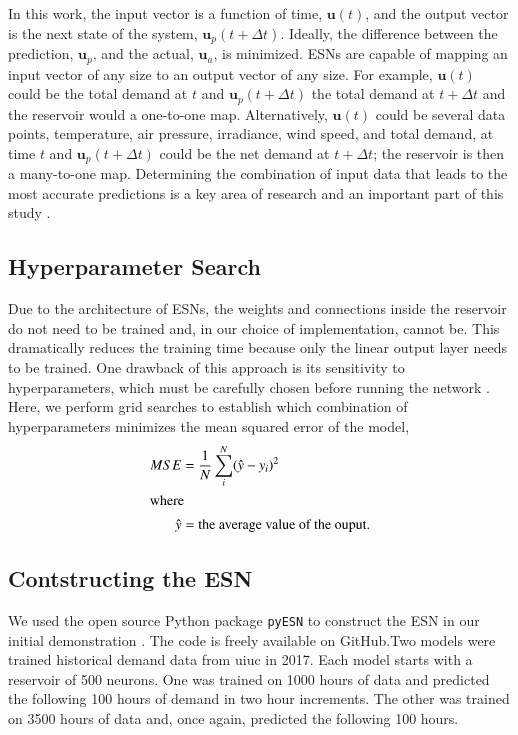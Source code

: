 In this
work, the input vector is a function of time, $\bm{u}(t)$, and the output
vector is the next state of the system, $\bm{u}_p(t+\Delta t)$. Ideally, the
difference between the prediction, $\bm{u}_p$, and the actual, $\bm{u}_a$, is
minimized. \glspl{ESN} are capable of mapping an input vector of any size to
an output vector of any size. For example, $\bm{u}(t)$ could be the total
demand
at $t$ and $\bm{u}_p(t+\Delta t)$ the total demand at $t+\Delta t$ and the
reservoir would a one-to-one map. Alternatively, $\bm{u}(t)$ could be several
data points, temperature, air pressure, irradiance, wind speed, and total
demand, at time $t$ and $\bm{u}_p(t+\Delta t)$ could be the net demand at
$t+\Delta t$; the reservoir is then a many-to-one map. Determining the
combination of input data that leads to the most accurate predictions is a key
area of research and an important part of this study \cite{kobylinski_high-resolution_2020,bianchi_reservoir_2020}.

\subsection{Hyperparameter Search}
Due to the architecture of \glspl{ESN}, the weights and connections
inside the reservoir do not need to be trained and, in our choice of
implementation, cannot be. This dramatically reduces the training time because
only the linear output layer needs to be trained. One drawback of this approach
is its sensitivity to hyperparameters, which must be carefully chosen before
running the network \cite{ pathak_model-free_2018,
lukosevicius_practical_2012, lukosevicius_reservoir_2009,gallicchio_deep_2019}.
Here, we perform grid searches
to establish which combination of hyperparameters minimizes the mean squared
error of the model,
\begin{align}
	MSE &= \frac{1}{N}\sum_i^N (\hat{y} - y_i)^2\\
	\intertext{where}
	\hat{y} &= \mbox{the average value of the ouput.}\nonumber
\end{align}

\subsection{Contstructing the \gls{ESN}}

We used the open source Python package \texttt{pyESN} to construct the
\gls{ESN} in our initial demonstration \cite{korndorfer_pyesn_2015}. The code
is freely available on GitHub.Two models were trained
historical demand data from \gls{uiuc} in 2017.  Each model starts with a
reservoir of 500 neurons. One was trained on 1000 hours of
data and predicted the following 100 hours of demand in two hour
increments. The other was trained on 3500 hours of data and, once again,
predicted the following 100 hours.


